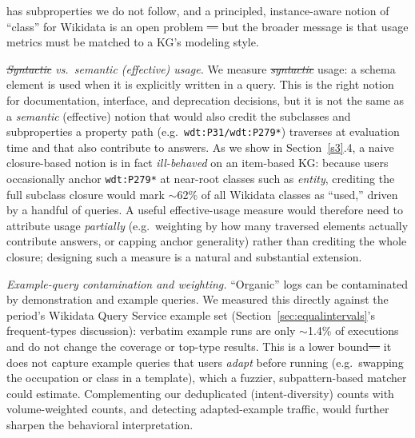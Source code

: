\documentclass[sw]{iosart2x}
\providecommand{\DIFadd}[1]{{\protect\color{blue}\uwave{#1}}} %
\providecommand{\DIFdel}[1]{{\protect\color{red}\sout{#1}}} %
\providecommand{\DIFaddbegin}{} %
\providecommand{\DIFaddend}{} %
\providecommand{\DIFdelbegin}{} %
\providecommand{\DIFdelend}{} %
\providecommand{\DIFscaledelfig}{0.5}
\newlength{\DIFdelgraphicswidth} %
\newlength{\DIFdelgraphicsheight} %
\providecommand{\DIFaddincludegraphics}[2][]{{\color{blue}\fbox{\DIFOincludegraphics[#1]{#2}}}} %
\providecommand{\DIFdelincludegraphics}[2][]{%
\sbox{\DIFdelgraphicsbox}{\DIFOincludegraphics[#1]{#2}}%
\settoboxwidth{\DIFdelgraphicswidth}{\DIFdelgraphicsbox} %
\settoboxtotalheight{\DIFdelgraphicsheight}{\DIFdelgraphicsbox} %
\scalebox{\DIFscaledelfig}{%
\parbox[b]{\DIFdelgraphicswidth}{\usebox{\DIFdelgraphicsbox}\\[-\baselineskip] \rule{\DIFdelgraphicswidth}{0em}}\llap{\resizebox{\DIFdelgraphicswidth}{\DIFdelgraphicsheight}{%
\setlength{\unitlength}{\DIFdelgraphicswidth}%
\begin{picture}(1,1)%
\thicklines\linethickness{2pt} %
{\color[rgb]{1,0,0}\put(0,0){\framebox(1,1){}}}%
{\color[rgb]{1,0,0}\put(0,0){\line( 1,1){1}}}%
{\color[rgb]{1,0,0}\put(0,1){\line(1,-1){1}}}%
\end{picture}%
}\hspace*{3pt}}} %
} %
\DeclareRobustCommand{\DIFaddbegin}{\DIFOaddbegin \let\includegraphics\DIFaddincludegraphics} %
\DeclareRobustCommand{\DIFaddend}{\DIFOaddend \let\includegraphics\DIFOincludegraphics} %
\DeclareRobustCommand{\DIFdelbegin}{\DIFOdelbegin \let\includegraphics\DIFdelincludegraphics} %
\DeclareRobustCommand{\DIFdelend}{\DIFOaddend \let\includegraphics\DIFOincludegraphics} %
\begin{document}
has subproperties we do not follow, and a principled, instance-aware notion of ``class''
for Wikidata is an open problem \cite{brasileiro2016applying,piscopo2018who,patelschneider2024class}\DIFdelbegin \DIFdel{--- }\DIFdelend \DIFaddbegin \DIFadd{, }\DIFaddend but the broader message is that usage metrics must be matched to a KG's modeling style.

\emph{\DIFdelbegin \DIFdel{Syntactic }\DIFdelend \DIFaddbegin \DIFadd{Explicit }\DIFaddend vs.\ semantic (effective) usage.} We measure \emph{\DIFdelbegin \DIFdel{syntactic}\DIFdelend \DIFaddbegin \DIFadd{explicit}\DIFaddend } usage: a schema element is used when it is explicitly written in a query. This is the right notion for documentation, interface, and deprecation decisions, but it is not the same as a \emph{semantic} (effective) notion that would also credit the subclasses and subproperties a property path (e.g.\ \texttt{wdt:P31/wdt:P279*}) traverses at evaluation time and that also contribute to answers. As we show in Section~\ref{s3}.4, a naive closure-based notion is in fact \emph{ill-behaved} on an item-based KG: because users occasionally anchor \texttt{wdt:P279*} at near-root classes such as \emph{entity}, crediting the full subclass closure would mark $\sim$62\% of all Wikidata classes as ``used,'' driven by a handful of queries. A useful effective-usage measure would therefore need to attribute usage \emph{partially} (e.g.\ weighting by how many traversed elements actually contribute answers, or capping anchor generality) rather than crediting the whole closure; designing such a measure is a natural and substantial extension.

\emph{Example-query contamination and weighting.} ``Organic'' logs can be contaminated by demonstration and example queries. We measured this directly against the period's Wikidata Query Service example set (Section~\ref{sec:equalintervals}'s frequent-types discussion): verbatim example runs are only $\sim$1.4\% of executions and do not change the coverage or top-type results. This is a lower bound\DIFdelbegin \DIFdel{--- }\DIFdelend \DIFaddbegin \DIFadd{, }\DIFaddend it does not capture example queries that users \emph{adapt} before running (e.g.\ swapping the occupation or class in a template), which a fuzzier, subpattern-based matcher could estimate. Complementing our deduplicated (intent-diversity) counts with volume-weighted counts, and detecting adapted-example traffic, would further sharpen the behavioral interpretation.
\end{document}
